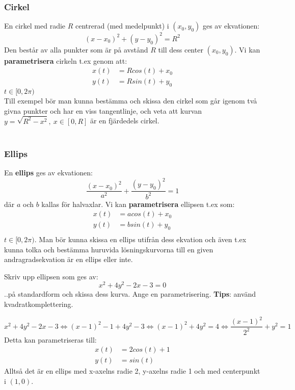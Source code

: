 \documentclass{report}
\begin{document}
\subsubsection{Cirkel}
En cirkel med radie $ R $ centrerad (med medelpunkt) i $ (x_0, y_0) $ ges av ekvationen:
\begin{equation*}
	(x-x_0)^2 + (y-y_0)^2 = R^2
\end{equation*}
Den består av alla punkter som är på avstånd $ R $ till dess center $ (x_0, y_0) $. Vi kan \textbf{parametrisera} cirkeln t.ex genom att:
\begin{align*}
	x(t) &= Rcos(t) + x_0\\
	y(t) &= Rsin(t) + y_0
\end{align*}
$ t \in [0, 2\pi) $\\
Till exempel bör man kunna bestämma och skissa den cirkel som går igenom två givna punkter och har en viss tangentlinje, och veta att kurvan $ y = \sqrt{R^2-x^2},\:x \in [0,R]  $ är en fjärdedels cirkel.\\\\

\subsubsection{Ellips}
En \textbf{ellips} ges av ekvationen:
\begin{equation*}
\frac{(x-x_0)^2}{a^2} + \frac{(y-y_0)^2}{b^2} = 1
\end{equation*}
där $ a $ och $ b $ kallas för halvaxlar. Vi kan \textbf{parametrisera} ellipsen t.ex som:
\begin{align*}
	x(t) &= a cos(t) + x_0\\
	y(t) &= b sin(t) + y_0 \\
\end{align*}
$ t \in [0,2\pi) $. Man bör kunna skissa en ellips utifrån dess ekvation och även t.ex kunna tolka och bestämma huruvida lösningskurvorna till en given andragradsekvation är en ellips eller inte.

\qs{}
{
Skriv upp ellipsen som ges av:
\begin{equation*}
	x^2+4y^2-2x-3 = 0
\end{equation*}
..på standardform och skissa dess kurva. Ange en parametrisering. \textbf{Tips}: använd kvadratkomplettering.
}

\sol 
\begin{equation*}
x^2 + 4y^2-2x-3 \iff (x-1)^2-1+4y^2-3 \iff (x-1)^2 + 4y^2 = 4 \iff \frac{(x-1)^2}{2^2} + y^2 = 1
\end{equation*}
Detta kan parametriseras till:
\begin{align*}
	x(t) &= 2cos(t)+1\\
	y(t) &= sin(t)
\end{align*}
Alltså det är en ellips med x-axelns radie 2, y-axelns radie 1 och med centerpunkt i $ (1,0) $.
\end{document}

